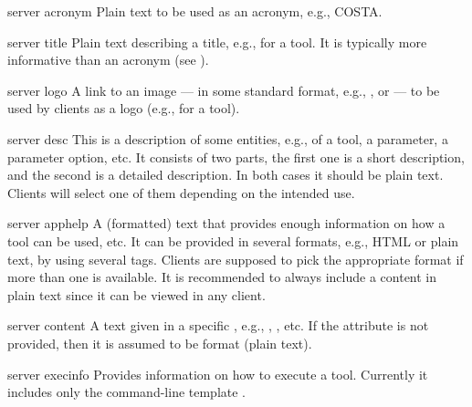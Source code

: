 \bigskip
\xmlstruct
{server}
{acronym}
{%
%
  Plain text to be used as an acronym, e.g., COSTA.
%
}



\bigskip
\xmlstruct
{server}
{title}
{%
%
  Plain text describing a title, e.g., for a tool. It is
  typically more informative than an acronym (see
  ).
%
}



\bigskip
\xmlstruct
{server}
{logo}
{%
%
  A link to an image --- in some standard format, e.g.,
  ,  or 
  --- to be used by clients as a logo (e.g., for a tool).
%
}



\bigskip
\xmlstruct
{server}
{desc}
{%
%
  This is a description of some entities, e.g., of a tool, a
  parameter, a parameter option, etc. It consists of two parts, the
  first one is a short description, and the second is a detailed
  description. In both cases it should be plain text. Clients will
  select one of them depending on the intended use.
%
}
{}%


\bigskip
\xmlstruct
{server}
{apphelp}
{%
%
  A (formatted) text that provides enough information on how a tool
  can be used, etc. It can be provided in several formats, e.g., HTML
  or plain text, by using several 
  tags. Clients are supposed to pick the appropriate format if more
  than one is available. It is recommended to always include a content
  in plain text since it can be viewed in any client.
%
}



\bigskip
\xmlstruct
{server}
{content}
{%
%
  A text given in a specific , e.g.,
  , , etc. If the attribute
   is not provided, then it is assumed to be
   format (plain text). 
%
}


\bigskip
\xmlstruct
{server}
{execinfo}
{%
%
  Provides information on how to execute a tool. Currently it
  includes only the command-line template
  .
%
}


